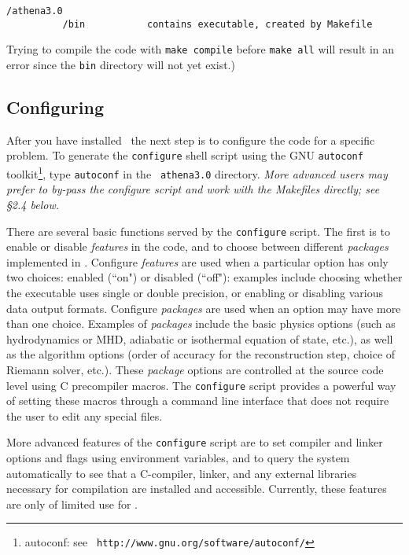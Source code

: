 \footnotesize
\begin{verbatim}
/athena3.0
          /bin           contains executable, created by Makefile
\end{verbatim}
\normalsize

Trying to compile the code with {\tt make compile} before
{\tt make all} will result in an error since the {\tt bin} directory will
not yet exist.)

\subsection{Configuring \ath}

After you have installed \ath\, the next step is to configure the
code for a specific problem.  To generate the {\tt configure} shell
script using the GNU {\tt autoconf} toolkit\footnote{autoconf: see {\tt
http://www.gnu.org/software/autoconf/}}, type {\tt autoconf} in the {\tt
athena3.0} directory.  {\em More advanced users may prefer to by-pass the
configure script and work with the Makefiles directly; see \S 2.4 below.}

There are several basic functions served by the {\tt configure} script.
The first is to enable or disable {\it features} in the code, and to
choose between different {\it packages} implemented in \ath.  Configure
{\it features} are used when a particular option has only two choices:
enabled (``on") or disabled (``off"): examples include choosing whether
the executable uses single or double precision, or enabling or disabling
various data output formats.  Configure {\it packages} are used when an
option may have more than one choice.  Examples of {\it packages} include
the basic physics options (such as hydrodynamics or MHD, adiabatic or
isothermal equation of state, etc.), as well as the algorithm options
(order of accuracy for the reconstruction step, choice of Riemann solver,
etc.).  These {\it package} options are controlled at the source code
level using C precompiler macros.  The {\tt configure} script provides
a powerful way of setting these macros through a command line interface
that does not require the user to edit any special files.

More advanced features of the {\tt configure} script are to set compiler
and linker options and flags using environment variables, and to query the
system automatically to see that a C-compiler, linker, and any external
libraries necessary for compilation are installed and accessible.
Currently, these features are only of limited use for \ath.

